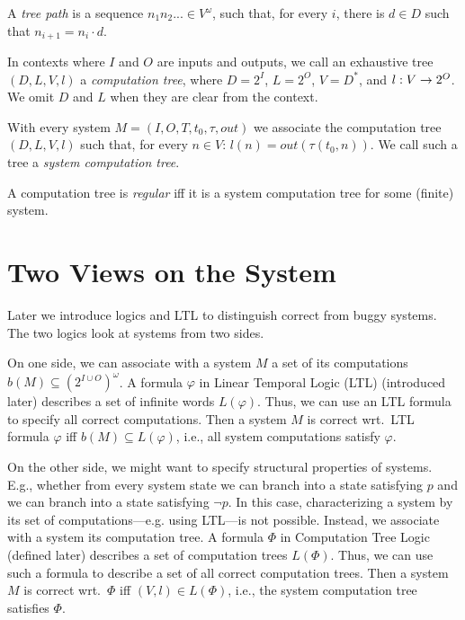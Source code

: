 A \emph{tree path} is a sequence $n_1 n_2 ... \in V^\omega$,
such that, for every $i$, there is $d \in D$ such that $n_{i+1} = n_i \cdot d$.


In contexts where $I$ and $O$ are inputs and outputs,
we call an exhaustive tree $(D,L,V,l)$
a \emph{computation tree},
where $D=2^I$, $L=2^O$, $V=D^*$, and $l:V \to {2^O}$.
We omit $D$ and $L$ when they are clear from the context.

With every system $M=(I, O, T, t_0, \tau, out)$ we associate
the computation tree $(D, L, V, l)$ such that, for every $n\in V$:
$l(n)=out(\tau(t_0,n))$.
We call such a tree a \emph{system computation tree}.

A computation tree is \emph{regular}
iff it is a system computation tree for some (finite) system.



\section*{Two Views on the System}\label{defs:two-views-on-system}

Later we introduce logics \CTLstar and LTL to distinguish correct from buggy systems.
The two logics look at systems from two sides.

On one side,
we can associate with a system $M$
a set of its computations $b(M) \subseteq (2^{I\cup O})^\omega$.
A formula $\varphi$ in Linear Temporal Logic (LTL) (introduced later)
describes a set of infinite words $L(\varphi)$.
Thus, we can use an LTL formula to specify all correct computations.
Then a system $M$ is correct wrt.\ LTL formula $\varphi$
iff $b(M) \subseteq L(\varphi)$,
i.e., all system computations satisfy $\varphi$.

On the other side, we might want to specify structural properties of systems.
E.g.,
whether from every system state
we can branch into a state satisfying $p$ and
we can branch into a state satisfying $\neg p$.
In this case, characterizing a system by its set of computations---e.g. using LTL---is not possible.
Instead, we associate with a system its computation tree.
A formula $\Phi$ in Computation Tree Logic (defined later)
describes a set of computation trees $L(\Phi)$.
Thus, we can use such a formula to describe a set of all correct computation trees.
Then a system $M$ is correct wrt.\ $\Phi$ iff $(V,l) \in L(\Phi)$,
i.e., the system computation tree satisfies $\Phi$.


